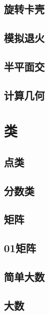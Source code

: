 \section{旋转卡壳}
\raggedbottom
\hrulefill
\section{模拟退火}
\raggedbottom
\hrulefill
\section{半平面交}
\raggedbottom
\hrulefill
\section{计算几何}
\raggedbottom
\hrulefill

\chapter{类}
\section{点类}
\raggedbottom
\hrulefill
\section{分数类}
\raggedbottom
\hrulefill
\section{矩阵}
\raggedbottom
\hrulefill
\section{01矩阵}
\raggedbottom
\hrulefill
\section{简单大数}
\raggedbottom
\hrulefill
\section{大数}
\raggedbottom
\hrulefill
